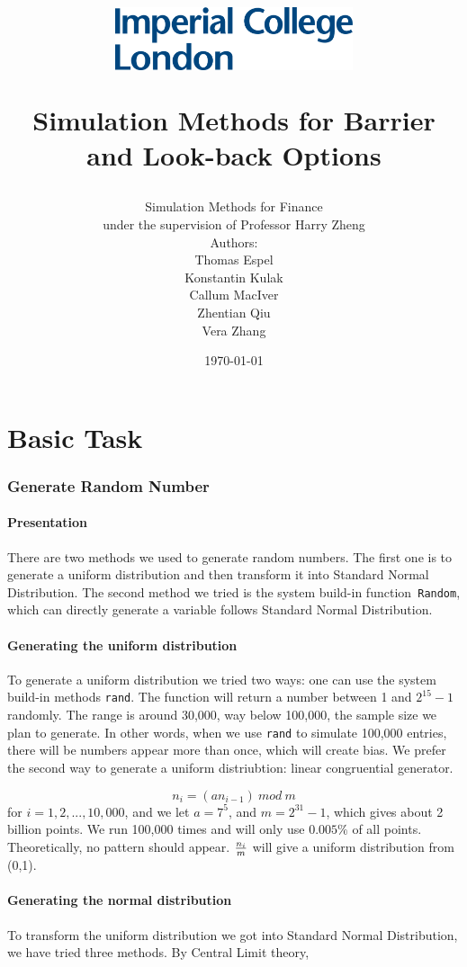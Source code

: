 \documentclass[11pt,a4paper,fleqn,draft]{article}
\author{{\LARGE Simulation Methods for Finance}\\under the supervision of Professor Harry Zheng
\\[5cm] Authors:\\
Thomas Espel\\ Konstantin Kulak\\ Callum MacIver\\Zhentian Qiu\\Vera Zhang\\[6.5cm]}
\title{\vspace*{-2cm}\begin{flushleft}\includegraphics[width=7cm]{imperial.png}\end{flushleft}
\vspace*{4cm}
\Huge\sffamily Simulation Methods for Barrier and Look-back Options}
\date{\sffamily\today}
\begin{document}
\maketitle
\thispagestyle{empty}

\newpage
\tableofcontents
\newpage
\setcounter{page}{1}

\part{Basic Task}
\section{Generate Random Number}
\subsection{Presentation}
There are two methods we used to generate random numbers.
The first one is to generate a uniform distribution and then transform it into Standard Normal Distribution. The second method we tried is the system build-in function\texttt{ Random}, which can directly generate a variable follows Standard Normal Distribution.
\subsection{Generating the uniform distribution}
To generate a uniform distribution we tried two ways: one can use the system build-in methods \texttt{rand}. The function will return a number between 1 and $2^{15} -1$ randomly. The range is around 30,000, way below 100,000, the sample size we plan to generate. In other words, when we use \texttt{rand} to simulate 100,000 entries, there will be numbers appear more than once, which will create bias. We prefer the second way to generate a uniform distriubtion: linear congruential generator.

$$n_i = (an_{i-1}) \ mod\ m$$for $i=1,2,...,10,000$, and we let $ a = 7^5$, and $m = 2^{31}-1$, which gives about 2 billion points. We run 100,000 times and will only use $0.005\%$ of all points. Theoretically, no pattern should appear. ${n_i \over m}$ will give a uniform distribution from (0,1).
\subsection{Generating the normal distribution}
To transform the uniform distribution we got into Standard Normal Distribution, we have tried three methods. By Central Limit theory,
\end{document}
